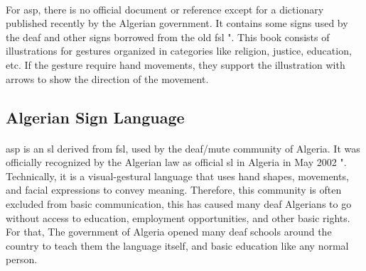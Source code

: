 \paragraph{}
For \ac{asp}, there is no official document or reference except for a dictionary published recently by the Algerian government. It contains some signs used by the deaf and other signs borrowed from the old \ac{fsl} "\cite{chalenges}. This book consists of illustrations for gestures organized in categories like religion, justice, education, etc. If the gesture require hand movements, they support the illustration with arrows to show the direction of the movement.
\subsection{Algerian Sign Language}
\paragraph{}
\ac{asp} is an \ac{sl} derived from \ac{fsl}, used by the deaf/mute community of Algeria. It was officially recognized by the Algerian law as official \ac{sl} in Algeria in May 2002 "\cite{wiki}. Technically, it is a visual-gestural language that uses hand shapes, movements, and facial expressions to convey meaning. Therefore, this community is often excluded from basic communication, this has caused many deaf Algerians to go without access to education, employment opportunities, and other basic rights. For that, The government of Algeria opened many deaf schools around the country to teach them the language itself, and basic education like any normal person.
